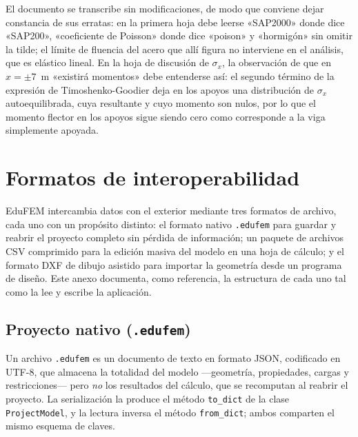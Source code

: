 El documento se transcribe sin modificaciones, de modo que conviene dejar constancia de sus erratas: en la primera hoja debe leerse «SAP2000» donde dice «SAP200», «coeficiente de Poisson» donde dice «poison» y «hormigón» sin omitir la tilde; el límite de fluencia del acero que allí figura no interviene en el análisis, que es elástico lineal. En la hoja de discusión de $\sigma_x$, la observación de que en $x = \pm 7$~m «existirá momentos» debe entenderse así: el segundo término de la expresión de Timoshenko-Goodier deja en los apoyos una distribución de $\sigma_x$ autoequilibrada, cuya resultante y cuyo momento son nulos, por lo que el momento flector en los apoyos sigue siendo cero como corresponde a la viga simplemente apoyada.





\chapter{Formatos de interoperabilidad}
\label{anexo:formatos}

EduFEM intercambia datos con el exterior mediante tres formatos de archivo, cada uno con un propósito distinto: el formato nativo \texttt{.edufem} para guardar y reabrir el proyecto completo sin pérdida de información; un paquete de archivos CSV comprimido para la edición masiva del modelo en una hoja de cálculo; y el formato DXF de dibujo asistido para importar la geometría desde un programa de diseño. Este anexo documenta, como referencia, la estructura de cada uno tal como la lee y escribe la aplicación.

\section{Proyecto nativo (\texttt{.edufem})}

Un archivo \texttt{.edufem} es un documento de texto en formato JSON, codificado en UTF-8, que almacena la totalidad del modelo ---geometría, propiedades, cargas y restricciones--- pero \emph{no} los resultados del cálculo, que se recomputan al reabrir el proyecto. La serialización la produce el método \texttt{to\_dict} de la clase \texttt{ProjectModel}, y la lectura inversa el método \texttt{from\_dict}; ambos comparten el mismo esquema de claves.

